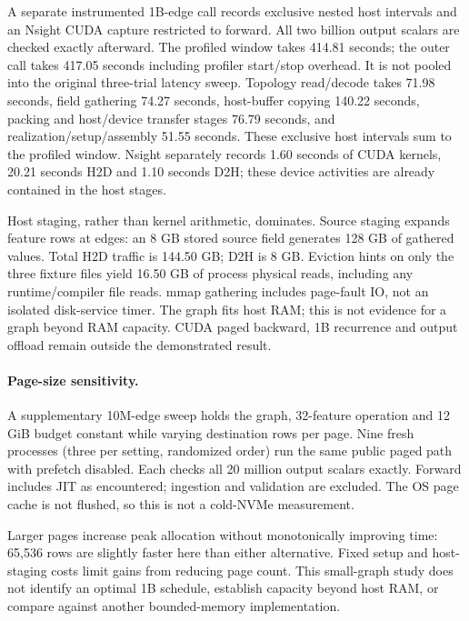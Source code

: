 A separate instrumented 1B-edge call records exclusive nested host intervals
and an Nsight CUDA capture restricted to forward. All two billion output
scalars are checked exactly afterward. The profiled window takes 414.81 seconds;
the outer call takes 417.05 seconds including profiler start/stop overhead.
It is not pooled into the original three-trial latency sweep.
Topology read/decode takes 71.98 seconds, field gathering 74.27 seconds,
host-buffer copying 140.22 seconds, packing and host/device transfer stages
76.79 seconds, and realization/setup/assembly 51.55 seconds.
These exclusive host intervals sum to the profiled window. Nsight separately
records 1.60 seconds of CUDA kernels, 20.21 seconds H2D and 1.10 seconds D2H;
these device activities are already contained in the host stages.

Host staging, rather than kernel arithmetic, dominates. Source staging expands
feature rows at edges: an 8 GB stored source field generates 128 GB of gathered
values. Total H2D traffic is 144.50 GB; D2H is 8 GB. Eviction hints on only the
three fixture files yield 16.50 GB of process physical reads, including any
runtime/compiler file reads. mmap gathering includes page-fault IO, not an
isolated disk-service timer. The graph fits host RAM; this is not evidence for
a graph beyond RAM capacity. CUDA paged backward, 1B recurrence and output
offload remain outside the demonstrated result.

\paragraph{Page-size sensitivity.}
A supplementary 10M-edge sweep holds the graph, 32-feature operation and 12 GiB
budget constant while varying destination rows per page. Nine fresh processes
(three per setting, randomized order) run the same public paged path with
prefetch disabled. Each checks all 20 million output scalars exactly.
Forward includes JIT as encountered; ingestion and validation are excluded.
The OS page cache is not flushed, so this is not a cold-NVMe measurement.
\begin{table}[htbp]
\centering\small

\caption{Page-size sensitivity at 10M edges. Forward shows median and range of
three complete calls; native peak is the maximum scoped device allocation.
It excludes CUDA context, external services and OS page cache.}
\label{tab:page-sensitivity}
\end{table}
Larger pages increase peak allocation without monotonically improving time:
65,536 rows are slightly faster here than either alternative. Fixed setup and
host-staging costs limit gains from reducing page count. This small-graph study
does not identify an optimal 1B schedule, establish capacity beyond host RAM,
or compare against another bounded-memory implementation.
\FloatBarrier

